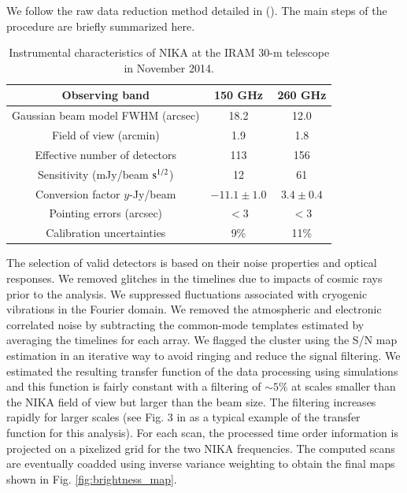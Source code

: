 \documentclass[traditabstract]{aa}
\begin{document}
\indent We follow the raw data reduction method detailed in (\citealt{CLJ1227NIKA}). The main steps of the procedure are briefly summarized here. 
\begin{table}[t]
\begin{center}
\begin{tabular}{ccc}
\hline
\hline
Observing band & 150 GHz & 260 GHz \\
\hline
Gaussian beam model FWHM (arcsec) & 18.2 & 12.0 \\
Field of view (arcmin) & 1.9 & 1.8 \\
Effective number of detectors & 113 & 156 \\
Sensitivity (mJy/beam $\rm{s^{1/2}}$) & 12 & 61 \\
Conversion factor $y$-Jy/beam & $-11.1\pm 1.0$ & $3.4\pm 0.4$ \\
Pointing errors (arcsec) & $<3$ & $<3$ \\
Calibration uncertainties & 9\% & 11\% \\
\hline
\hline
\end{tabular}
\end{center}
\caption{{\footnotesize Instrumental characteristics of NIKA at the IRAM 30-m telescope in November 2014.}}
\label{tab:NIKA_instru}
\end{table}
The selection of valid detectors is based on their noise properties and optical responses. We removed glitches in the timelines due to impacts of cosmic rays prior to the analysis. We suppressed fluctuations associated with cryogenic vibrations  in the Fourier domain. We removed the atmospheric and electronic correlated noise by subtracting the common-mode templates estimated by averaging the timelines for each array. We flagged the cluster using the S/N map estimation in an iterative way to avoid ringing and reduce the signal filtering. We estimated the resulting transfer function of the data processing using simulations and this function is fairly constant with a filtering of $\sim 5\%$ at scales smaller than the NIKA field of view but larger than the beam size. The filtering increases rapidly for larger scales (see Fig. 3 in \citealt{CLJ1227NIKA} as a typical example of the transfer function for this analysis). For each scan, the processed time order information is projected on a pixelized grid for the two NIKA frequencies. The computed scans are eventually coadded using inverse variance weighting to obtain the final maps shown in Fig. \ref{fig:brightness_map}.
\end{document}
